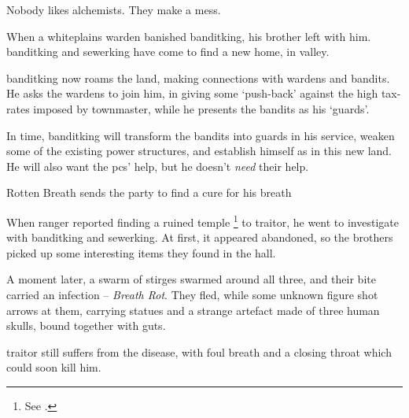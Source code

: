 \label{entitlement}


\begin{exampletext}
  \noindent
  Nobody likes alchemists.
  They make a mess.

  When a \gls{whiteplains} \gls{warden} banished \gls{banditking}, his brother left with him.
  \Gls{banditking} and \gls{sewerking} have come to find a new home, in \gls{valley}.

  \Gls{banditking} now roams the land, making connections with \glspl{warden} and bandits.
  He asks the \glspl{warden} to join him, in giving some `push-back' against the high tax-rates imposed by \gls{townmaster}, while he presents the bandits as his `guards'.
\end{exampletext}

In time, \gls{banditking} will transform the bandits into \glspl{guard} in his service, weaken some of the existing power structures, and establish himself as  in this new land.
He will also want the \glspl{pc}' help, but he doesn't \emph{need} their help.

{Rotten Breath}%
{ sends the party to find a cure for his breath}%
\label{rottenBreath}

\begin{exampletext}
  When  \gls{ranger} reported finding a ruined temple%
  \footnote{See .}
  to \gls{traitor}, he went to investigate with \gls{banditking} and \gls{sewerking}.
  At first, it appeared abandoned, so the brothers picked up some interesting items they found in the hall.

  A moment later, a swarm of stirges swarmed around all three, and their bite carried an infection -- \textit{Breath Rot}.
  They fled, while some unknown figure shot arrows at them, carrying statues and a strange \gls{artefact} made of three human skulls, bound together with guts.

  \Gls{traitor} still suffers from the disease, with foul breath and a closing throat which could soon kill him.
\end{exampletext}

